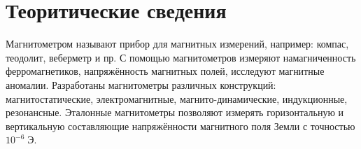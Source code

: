 \section{Теоритические сведения}
Магнитометром называют прибор для магнитных измерений, например: компас, теодолит, веберметр и пр. С помощью магнитометров измеряют намагниченность ферромагнетиков, напряжённость магнитных полей, исследуют магнитные аномалии. Разработаны магнитометры различных конструкций: магнитостатические, электромагнитные, магнито-динамические, индукционные, резонансные. Эталонные магнитометры позволяют измерять горизонтальную и вертикальную составляющие напряжённости магнитного поля Земли с точностью $10^{-6}\;\text{Э}$.
